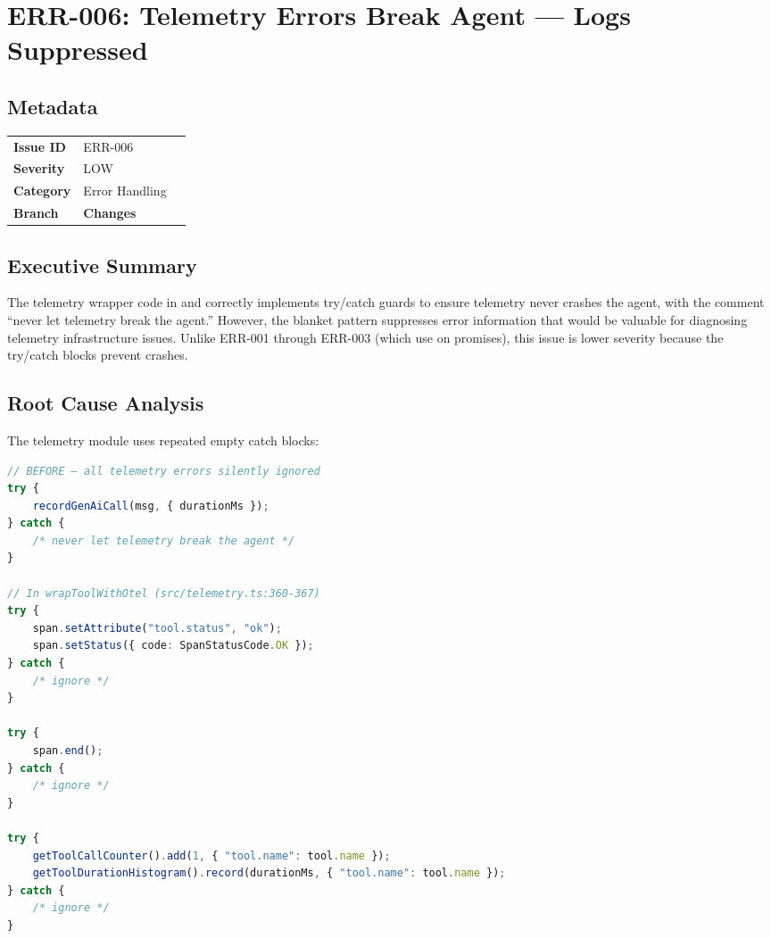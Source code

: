 \section{ERR-006: Telemetry Errors Break Agent — Logs Suppressed}
\label{sec:err-006}
\subsection*{Metadata}
\begin{tabular}{ll}
\textbf{Issue ID} & ERR-006 \\
\textbf{Severity} & LOW \\
\textbf{Category} & Error Handling \\
\textbf{Branch} & 
\textbf{Changes} &  \\
\end{tabular}

\subsection*{Executive Summary}
The telemetry wrapper code in  and  correctly implements try/catch guards to ensure telemetry never crashes the agent, with the comment ``never let telemetry break the agent.'' However, the blanket  pattern suppresses error information that would be valuable for diagnosing telemetry infrastructure issues. Unlike ERR-001 through ERR-003 (which use  on promises), this issue is lower severity because the try/catch blocks prevent crashes.

\subsection*{Root Cause Analysis}
The telemetry module uses repeated empty catch blocks:

\begin{lstlisting}[language=TypeScript]
// BEFORE — all telemetry errors silently ignored
try {
    recordGenAiCall(msg, { durationMs });
} catch {
    /* never let telemetry break the agent */
}

// In wrapToolWithOtel (src/telemetry.ts:360-367)
try {
    span.setAttribute("tool.status", "ok");
    span.setStatus({ code: SpanStatusCode.OK });
} catch {
    /* ignore */
}

try {
    span.end();
} catch {
    /* ignore */
}

try {
    getToolCallCounter().add(1, { "tool.name": tool.name });
    getToolDurationHistogram().record(durationMs, { "tool.name": tool.name });
} catch {
    /* ignore */
}
\end{lstlisting}

